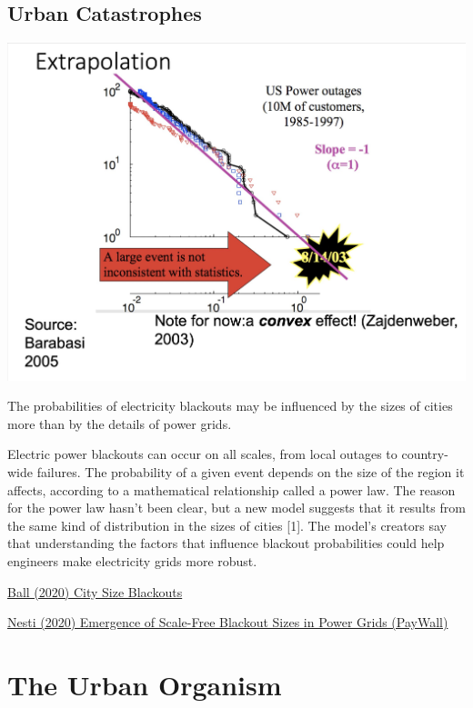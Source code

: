 \documentclass[
]{book}
\begin{document}
\hypertarget{urban-catastrophes}{%
\section{Urban Catastrophes}\label{urban-catastrophes}}

\includegraphics{fig/US_Power_Outages.jpeg}

The probabilities of electricity blackouts may be influenced by the sizes of cities
more than by the details of power grids.

Electric power blackouts can occur on all scales, from local outages to country-wide failures. The probability of a given event depends on the size of the region it affects, according to a mathematical relationship called a power law. The reason for the power law hasn't been clear, but a new model suggests that it results from the same kind of distribution in the sizes of cities {[}1{]}. The model's creators say that understanding the factors that influence blackout probabilities could help engineers make electricity grids more robust.

\href{https://physics.aps.org/articles/v13/122}{Ball (2020) City Size Blackouts}

\href{https://journals.aps.org/prl/abstract/10.1103/PhysRevLett.125.058301}{Nesti (2020) Emergence of Scale-Free Blackout Sizes in Power Grids (PayWall)}

\hypertarget{the-urban-organism}{%
\chapter{The Urban Organism}\label{the-urban-organism}}
\end{document}
